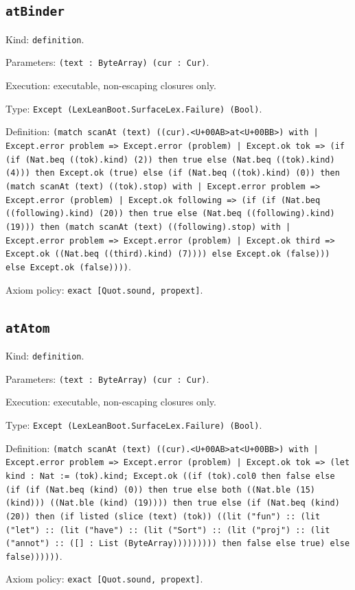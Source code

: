 \documentclass[11pt]{article}
\begin{document}
\subsection*{\texttt{atBinder}}
\noindent Kind: \texttt{definition}.\par
\noindent Parameters: \texttt{(text : ByteArray) (cur : Cur)}.\par
\noindent Execution: executable, non-escaping closures only.\par
\noindent Type: \texttt{Except (LexLeanBoot.SurfaceLex.Failure) (Bool)}.\par
\noindent Definition: \texttt{(match scanAt (text) ((cur).<U+00AB>at<U+00BB>) with | Except.error problem => Except.error (problem) | Except.ok tok => (if (if (Nat.beq ((tok).kind) (2)) then true else (Nat.beq ((tok).kind) (4))) then Except.ok (true) else (if (Nat.beq ((tok).kind) (0)) then (match scanAt (text) ((tok).stop) with | Except.error problem => Except.error (problem) | Except.ok following => (if (if (Nat.beq ((following).kind) (20)) then true else (Nat.beq ((following).kind) (19))) then (match scanAt (text) ((following).stop) with | Except.error problem => Except.error (problem) | Except.ok third => Except.ok ((Nat.beq ((third).kind) (7)))) else Except.ok (false))) else Except.ok (false))))}.\par
\noindent Axiom policy: \texttt{exact [Quot.sound, propext]}.\par
\subsection*{\texttt{atAtom}}
\noindent Kind: \texttt{definition}.\par
\noindent Parameters: \texttt{(text : ByteArray) (cur : Cur)}.\par
\noindent Execution: executable, non-escaping closures only.\par
\noindent Type: \texttt{Except (LexLeanBoot.SurfaceLex.Failure) (Bool)}.\par
\noindent Definition: \texttt{(match scanAt (text) ((cur).<U+00AB>at<U+00BB>) with | Except.error problem => Except.error (problem) | Except.ok tok => (let kind : Nat := (tok).kind; Except.ok ((if (tok).col0 then false else (if (if (Nat.beq (kind) (0)) then true else both ((Nat.ble (15) (kind))) ((Nat.ble (kind) (19)))) then true else (if (Nat.beq (kind) (20)) then (if listed (slice (text) (tok)) ((lit ("fun") :: (lit ("let") :: (lit ("have") :: (lit ("Sort") :: (lit ("proj") :: (lit ("annot") :: ([] : List (ByteArray))))))))) then false else true) else false))))))}.\par
\noindent Axiom policy: \texttt{exact [Quot.sound, propext]}.\par
\end{document}

